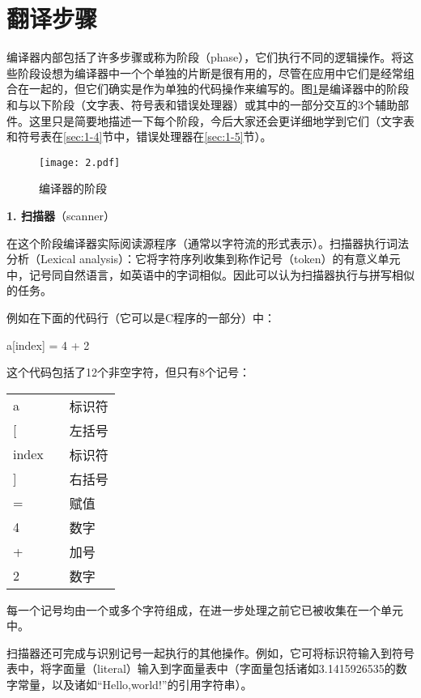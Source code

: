 \documentclass[lang=cn,10pt]{elegantbook}
\begin{document}
\section{翻译步骤}
\label{sec:1-3}

编译器内部包括了许多步骤或称为阶段（phase），它们执行不同的逻辑操作。将这些阶段设想为编译器中一个个单独的片断是很有用的，尽管在应用中它们是经常组合在一起的，但它们确实是作为单独的代码操作来编写的。图\ref{fig:compiler-phases}是编译器中的阶段和与以下阶段（文字表、符号表和错误处理器）或其中的一部分交互的3个辅助部件。这里只是简要地描述一下每个阶段，今后大家还会更详细地学到它们（文字表和符号表在\ref{sec:1-4}节中，错误处理器在\ref{sec:1-5}节）。

\begin{figure}[htbp]
  \centering
  \texttt{[image: 2.pdf]}
  \caption{编译器的阶段}
  \label{fig:compiler-phases}
\end{figure}

\textbf{1. 扫描器}（scanner）

在这个阶段编译器实际阅读源程序（通常以字符流的形式表示）。扫描器执行词法分析（Lexical analysis）：它将字符序列收集到称作记号（token）的有意义单元中，记号同自然语言，如英语中的字词相似。因此可以认为扫描器执行与拼写相似的任务。

例如在下面的代码行（它可以是C程序的一部分）中：

a[index] = 4 + 2

这个代码包括了12个非空字符，但只有8个记号：

\begin{tabular}{lll}
  a     & \quad\quad\quad\quad & 标识符 \\
  {[}   & \quad\quad\quad\quad & 左括号 \\
  index & \quad\quad\quad\quad & 标识符 \\
  {]}   & \quad\quad\quad\quad & 右括号 \\
  =     & \quad\quad\quad\quad & 赋值 \\
  4     & \quad\quad\quad\quad & 数字 \\
  +     & \quad\quad\quad\quad & 加号 \\
  2     & \quad\quad\quad\quad & 数字 \\
\end{tabular}

每一个记号均由一个或多个字符组成，在进一步处理之前它已被收集在一个单元中。

扫描器还可完成与识别记号一起执行的其他操作。例如，它可将标识符输入到符号表中，将字面量（literal）输入到字面量表中（字面量包括诸如3.1415926535的数字常量，以及诸如“Hello,world!”的引用字符串）。
\end{document}

